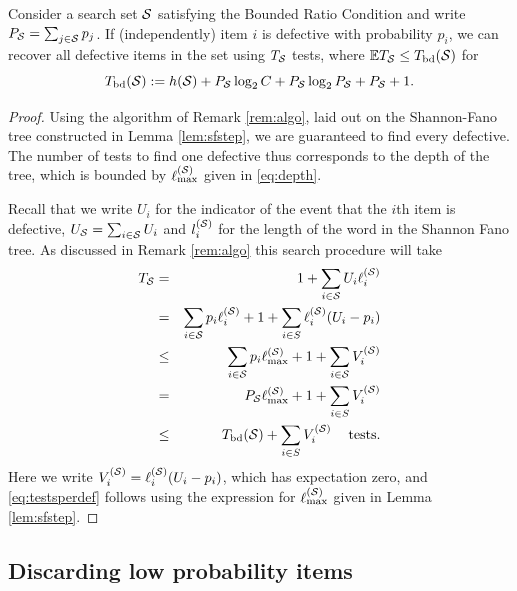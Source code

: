 \begin{lemma} \label{lem:expset}
 Consider a search set ${\mathcal{S}}$ satisfying the Bounded Ratio Condition  and write $P_{{\mathcal{S}}} = \sum_{j \in {\mathcal{S}}} p_j$.
If (independently) item $i$ is defective with probability $p_i$, 
we can recover  all defective items in the set using $T_{\mathcal{S}}$ tests, where ${\mathbb{E}} T_{\mathcal{S}} \leq T_{{\rm bd}}({\mathcal{S}})$ for
\begin{equation} \label{eq:tbds}
 T_{{\rm bd}}({\mathcal{S}}) :=  h({\mathcal{S}}) +  P_{{\mathcal{S}}} \log_2 C +  P_{{\mathcal{S}}} \log_2 P_{{\mathcal{S}}} + P_{\mathcal{S}} + 1. \end{equation}
\end{lemma}
\begin{proof}
Using the algorithm of Remark \ref{rem:algo}, laid out on the Shannon-Fano tree constructed in Lemma \ref{lem:sfstep}, we are guaranteed  to find every defective.
The number of tests to find one defective thus corresponds to the depth of the tree, which is bounded by  $\ell_{\max}^{({\mathcal{S}})}$ given in \eqref{eq:depth}.

Recall that we write $U_i$ for the indicator of the event that the $i$th item is defective, $U_{{\mathcal{S}}} = \sum_{i \in {\mathcal{S}}} U_i$ and 
$l_i^{({\mathcal{S}})}$ for the length of the word in the Shannon Fano tree. As discussed in Remark \ref{rem:algo}
this search procedure will take 
\begin{eqnarray}
T_{\mathcal{S}} & = &  1 + \sum_{i \in {\mathcal{S}}} U_i \ell_i^{({\mathcal{S}})} \nonumber \\
& = &  \sum_{i \in {\mathcal{S}}} p_i \ell_i^{({\mathcal{S}})} + 1 + \sum_{i \in S} \ell_i^{({\mathcal{S}})} (U_i - p_i)  \nonumber \\
& \leq & \sum_{i \in {\mathcal{S}}} p_i \ell_{\max}^{({\mathcal{S}})} +  1 + \sum_{i \in {\mathcal{S}}} V_i^{({\mathcal{S}})}  \nonumber \\
& =  &  P_{{\mathcal{S}}} \ell_{\max}^{({\mathcal{S}})} +  1 + \sum_{i \in S} V_i^{({\mathcal{S}})} \nonumber \\
& \leq  & T_{{\rm bd}}({\mathcal{S}}) + \sum_{i \in S} V_i^{({\mathcal{S}})} 
\mbox{ \;\; tests.} \label{eq:testsperdef} \end{eqnarray}
Here we write $V_ i^{({\mathcal{S}})} = \ell_i^{({\mathcal{S}})} (U_i - p_i)$, which has expectation zero, and \eqref{eq:testsperdef} follows using the expression for 
$\ell_{\max}^{({\mathcal{S}})}$ given in   Lemma \ref{lem:sfstep}.
\end{proof}

\subsection{Discarding low probability items} \label{sec:discard}

